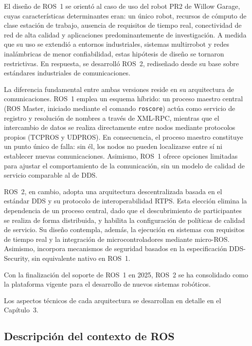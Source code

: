 El diseño de ROS~1 se orientó al caso de uso del robot PR2 de Willow Garage,
cuyas características determinantes eran: un único robot, recursos de cómputo
de clase estación de trabajo, ausencia de requisitos de tiempo real,
conectividad de red de alta calidad y aplicaciones predominantemente de
investigación. A medida que su uso se extendió a entornos industriales,
sistemas multirrobot y redes inalámbricas de menor confiabilidad, estas
hipótesis de diseño se tornaron restrictivas. En respuesta, se desarrolló
ROS~2, rediseñado desde su base sobre estándares industriales de
comunicaciones.

La diferencia fundamental entre ambas versiones reside en su arquitectura de
comunicaciones. ROS~1 emplea un esquema híbrido: un proceso maestro central
(ROS Master, iniciado mediante el comando \texttt{roscore}) actúa como
servicio de registro y resolución de nombres a través de XML-RPC, mientras que
el intercambio de datos se realiza directamente entre nodos mediante
protocolos propios (TCPROS y UDPROS). En consecuencia, el proceso maestro
constituye un punto único de falla: sin él, los nodos no pueden localizarse
entre sí ni establecer nuevas comunicaciones. Asimismo, ROS~1 ofrece opciones
limitadas para ajustar el comportamiento de la comunicación, sin un modelo de
calidad de servicio comparable al de DDS.

ROS~2, en cambio, adopta una arquitectura descentralizada basada en el
estándar DDS y su protocolo de
interoperabilidad RTPS. Esta elección elimina la dependencia de un proceso
central, dado que el descubrimiento de participantes se realiza de forma
distribuida, y habilita la configuración de políticas de calidad de servicio.
Su diseño contempla, además, la ejecución en sistemas con requisitos de
tiempo real y la integración de microcontroladores mediante micro-ROS.
Asimismo, incorpora mecanismos de seguridad basados en la especificación
DDS-Security, sin equivalente nativo en ROS~1.

Con la finalización del soporte de ROS~1 en 2025, ROS~2 se ha consolidado como
la plataforma vigente para el desarrollo de nuevos sistemas robóticos.

Los aspectos técnicos de cada arquitectura se desarrollan en detalle en el
Capítulo~3.

\subsection{Descripción del contexto de ROS}\label{sec:contexto}

